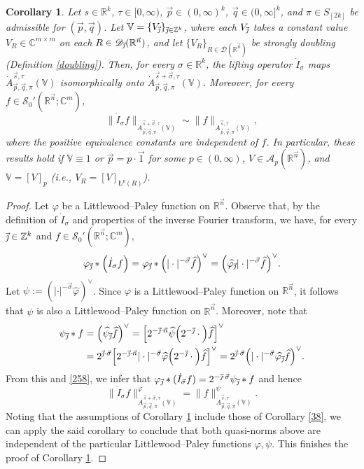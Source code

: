 \documentclass[11pt, reqno]{amsart}
\newtheorem{corollary}[theorem]{Corollary}
\theoremstyle{definition}
\theoremstyle{remark}
\numberwithin{equation}{section}
\newcommand{\A}{\mathscr A}
\newcommand{\C}{\mathbb C}
\newcommand{\D}{\mathscr D}
\newcommand{\R}{\mathbb R}
\newcommand{\V}{\mathbb V}
\newcommand{\Z}{\mathbb Z}
\newcommand{\vj}{\vec{\textit{\j}}}
\newcommand{\vn}{\vec n}
\newcommand{\vp}{\vec p}
\newcommand{\vq}{\vec q}
\newcommand{\aveL}{\textit{\L}}
\begin{document}
\begin{corollary}\label{257}
Let $s\in\R^k$, $\tau\in[0,\infty)$, $\vp\in(0,\infty)^k$, $\vq\in(0,\infty]^k$, and $\pi\in S_{[2k]}$ be admissible for $(\vp,\vq)$.
Let $\V=\{V_{\vj}\}_{\vj\in\Z^k}$, where each $V_{\vj}$ takes a constant value $V_R\in\C^{m\times m}$ on each $R\in\D_{\vj}(\R^{\vn})$, and let $\{V_R\}_{R\in\D(\R^{\vn})}$ be strongly doubling (Definition \ref{doubling}).
Then, for every $\sigma\in\R^k$, the lifting operator $\dot I_\sigma$ maps $\dot A_{\vec p,\vec q,\pi}^{\vec s,\tau}(\V)$ isomorphically onto $\dot A_{\vec p,\vec q,\pi}^{\vec s+\vec \sigma,\tau}(\V)$.
Moreover, for every $f\in\mathscr{S}_0'(\mathbb R^{\vec n};\C^m)$,
$$
\|\dot I_\sigma f\|_{\dot A_{\vec p,\vec q,\pi}^{\vec s+\vec \sigma,\tau}(\V)}
\sim \|f\|_{\dot A_{\vec p,\vec q,\pi}^{\vec s,\tau}(\V)},
$$
where the positive equivalence constants are independent of $f$.
In particular, these results hold
if $\V\equiv1$ or $\vp=p\cdot\vec1$ for some $p\in(0,\infty)$, $V\in\A_p(\R^{\vn})$,
and $\V=[V]_p$ (i.e., $V_R=[V]_{\aveL^p(R)}$).
\end{corollary}

\begin{proof}
Let $\varphi$ be a Littlewood--Paley function on $\mathbb R^{\vec n}$.
Observe that, by the definition of $\dot I_\sigma$
and properties of the inverse Fourier transform, we have,
for every $\vj\in\mathbb Z^k$ and $f\in \mathscr{S}_0'(\mathbb R^{\vec n};\C^m)$,
\begin{align}\label{258}
\varphi_{\vj}*\Big(\dot I_\sigma f\Big)
= \varphi_{\vj}*\Big(|\cdot|^{-\vec\sigma}\widehat{f}\Big)^\vee
= \Big(\widehat{\varphi_{\vj}}
|\cdot|^{-\vec\sigma}\widehat{f}\Big)^\vee.
\end{align}
Let $\psi:=(|\cdot|^{-\vec\sigma}\widehat{\varphi})^\vee$.
Since $\varphi$ is a Littlewood--Paley function on $\mathbb R^{\vec n}$,
it follows that $\psi$ is also a Littlewood--Paley function on $\mathbb R^{\vec n}$.
Moreover, note that
\begin{align*}
\psi_{\vj}*f
&=\Big(\widehat{\psi_{\vj}}\widehat{f}\Big)^\vee
=\Big[ 2^{-\vj\cdot\vec n}\widehat{\psi}\Big( 2^{-\vj}\cdot\Big)\widehat{f}\Big]^\vee\\
&=2^{\vj\cdot\vec\sigma}\Big[ 2^{-\vj\cdot\vec n} |\cdot|^{-\vec\sigma}
\widehat{\varphi}\Big( 2^{-\vj}\cdot\Big)\widehat{f}\Big]^\vee
=2^{\vj\cdot\vec\sigma}\Big( |\cdot|^{-\vec\sigma}
\widehat{\varphi_{\vj}}\widehat{f}\Big)^\vee.
\end{align*}
From this and \eqref{258}, we infer that $\varphi_{\vj}*(\dot I_{\vec\sigma} f)=2^{-\vj\cdot\vec\sigma}\psi_{\vj}*f$ and hence
$$
\|\dot I_\sigma f\|^\varphi_{\dot A_{\vec p,\vec q,\pi}^{\vec s+\vec \sigma,\tau}(\V)}
=\|f\|^\psi_{\dot A_{\vec p,\vec q,\pi}^{\vec s,\tau}(\V)}.
$$
Noting that the assumptions of Corollary \ref{257} include those of Corollary \ref{38},
we can apply the said corollary to conclude that both quasi-norms above are
independent of the particular Littlewood--Paley functions $\varphi,\psi$.
This finishes the proof of Corollary \ref{257}.
\end{proof}
\end{document}

